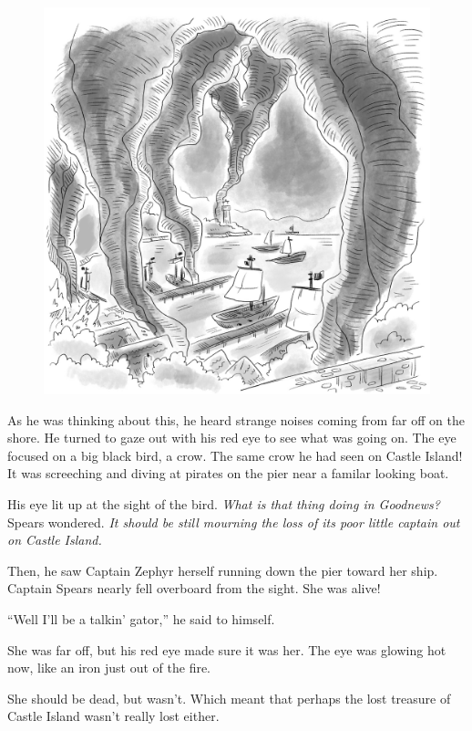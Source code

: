 \documentclass[12pt]{extbook}
\begin{document}
  \begin{figure}[htbp]
  \centering
  \includegraphics{img/battle_of_the_port.png}
  \caption{}
  \end{figure}
  
  As he was thinking about this, he heard strange noises coming from far
  off on the shore. He turned to gaze out with his red eye to see what was
  going on. The eye focused on a big black bird, a crow. The same crow he
  had seen on Castle Island! It was screeching and diving at pirates on
  the pier near a familar looking boat.
  
  His eye lit up at the sight of the bird. \emph{What is that thing doing
  in Goodnews?} Spears wondered. \emph{It should be still mourning the
  loss of its poor little captain out on Castle Island.}
  
  Then, he saw Captain Zephyr herself running down the pier toward her
  ship. Captain Spears nearly fell overboard from the sight. She was
  alive!
  
  \enquote{Well I'll be a talkin' gator,} he said to himself.
  
  She was far off, but his red eye made sure it was her. The eye was
  glowing hot now, like an iron just out of the fire.
  
  She should be dead, but wasn't. Which meant that perhaps the lost
  treasure of Castle Island wasn't really lost either.
  
\end{document}
